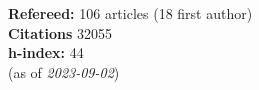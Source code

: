 \textbf{Refereed:} 106 articles (18 first author)\\\textbf{Citations} 32055\\\textbf{h-index:} 44\\(as of \textit{2023-09-02})